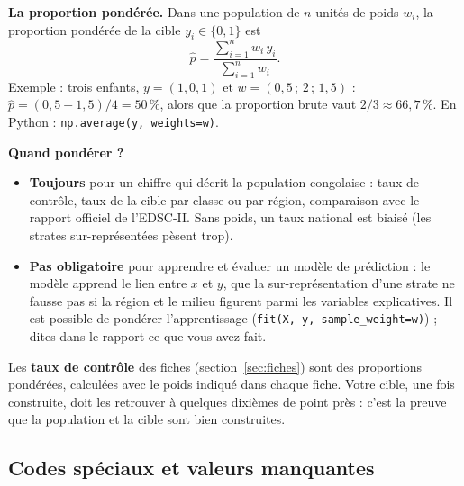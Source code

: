 \documentclass[11pt]{article}
\begin{document}
\textbf{La proportion pondérée.} Dans une population de $n$ unités de poids $w_i$, la proportion pondérée de la cible $y_i\in\{0,1\}$ est
\[
  \hat p=\frac{\sum_{i=1}^n w_i\,y_i}{\sum_{i=1}^n w_i}.
\]
Exemple : trois enfants, $y=(1,0,1)$ et $w=(0{,}5\,;\,2\,;\,1{,}5)$ : $\hat p=(0{,}5+1{,}5)/4=50\,\%$, alors que la proportion brute vaut $2/3\approx66{,}7\,\%$. En Python : \texttt{np.average(y, weights=w)}.

\textbf{Quand pondérer ?}
\begin{itemize}
  \item \textbf{Toujours} pour un chiffre qui décrit la population congolaise : taux de contrôle, taux de la cible par classe ou par région, comparaison avec le rapport officiel de l'EDSC-II. Sans poids, un taux national est biaisé (les strates sur-représentées pèsent trop).
  \item \textbf{Pas obligatoire} pour apprendre et évaluer un modèle de prédiction : le modèle apprend le lien entre $x$ et $y$, que la sur-représentation d'une strate ne fausse pas si la région et le milieu figurent parmi les variables explicatives. Il est possible de pondérer l'apprentissage (\texttt{fit(X, y, sample\_weight=w)}) ; dites dans le rapport ce que vous avez fait.
\end{itemize}
Les \textbf{taux de contrôle} des fiches (section~\ref{sec:fiches}) sont des proportions pondérées, calculées avec le poids indiqué dans chaque fiche. Votre cible, une fois construite, doit les retrouver à quelques dixièmes de point près : c'est la preuve que la population et la cible sont bien construites.

\subsection{Codes spéciaux et valeurs manquantes}
\label{sec:codes}
\end{document}
